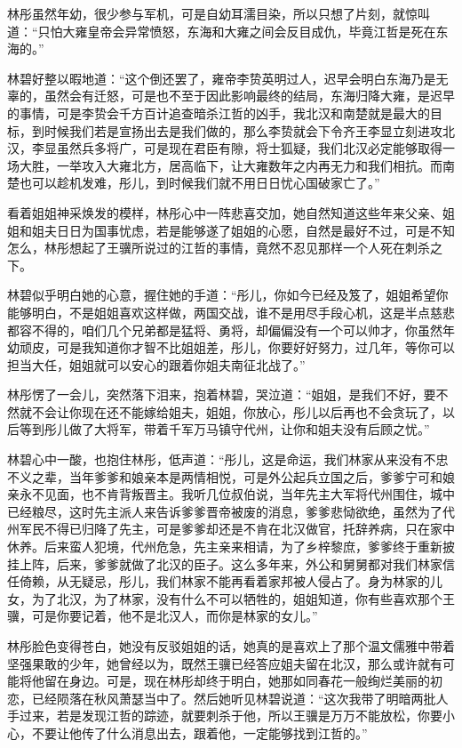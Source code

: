林彤虽然年幼，很少参与军机，可是自幼耳濡目染，所以只想了片刻，就惊叫道：“只怕大雍皇帝会异常愤怒，东海和大雍之间会反目成仇，毕竟江哲是死在东海的。”

林碧好整以暇地道：“这个倒还罢了，雍帝李贽英明过人，迟早会明白东海乃是无辜的，虽然会有迁怒，可是也不至于因此影响最终的结局，东海归降大雍，是迟早的事情，可是李贽会千方百计追查暗杀江哲的凶手，我北汉和南楚就是最大的目标，到时候我们若是宣扬出去是我们做的，那么李贽就会下令齐王李显立刻进攻北汉，李显虽然兵多将广，可是现在君臣有隙，将士狐疑，我们北汉必定能够取得一场大胜，一举攻入大雍北方，居高临下，让大雍数年之内再无力和我们相抗。而南楚也可以趁机发难，彤儿，到时候我们就不用日日忧心国破家亡了。”

看着姐姐神采焕发的模样，林彤心中一阵悲喜交加，她自然知道这些年来父亲、姐姐和姐夫日日为国事忧虑，若是能够遂了姐姐的心愿，自然是最好不过，可是不知怎么，林彤想起了王骥所说过的江哲的事情，竟然不忍见那样一个人死在刺杀之下。

林碧似乎明白她的心意，握住她的手道：“彤儿，你如今已经及笈了，姐姐希望你能够明白，不是姐姐喜欢这样做，两国交战，谁不是用尽手段心机，这是半点慈悲都容不得的，咱们几个兄弟都是猛将、勇将，却偏偏没有一个可以帅才，你虽然年幼顽皮，可是我知道你才智不比姐姐差，彤儿，你要好好努力，过几年，等你可以担当大任，姐姐就可以安心的跟着你姐夫南征北战了。”

林彤愣了一会儿，突然落下泪来，抱着林碧，哭泣道：“姐姐，是我们不好，要不然就不会让你现在还不能嫁给姐夫，姐姐，你放心，彤儿以后再也不会贪玩了，以后等到彤儿做了大将军，带着千军万马镇守代州，让你和姐夫没有后顾之忧。”

林碧心中一酸，也抱住林彤，低声道：“彤儿，这是命运，我们林家从来没有不忠不义之辈，当年爹爹和娘亲本是两情相悦，可是外公起兵立国之后，爹爹宁可和娘亲永不见面，也不肯背叛晋主。我听几位叔伯说，当年先主大军将代州围住，城中已经粮尽，这时先主派人来告诉爹爹晋帝被废的消息，爹爹悲恸欲绝，虽然为了代州军民不得已归降了先主，可是爹爹却还是不肯在北汉做官，托辞养病，只在家中休养。后来蛮人犯境，代州危急，先主亲来相请，为了乡梓黎庶，爹爹终于重新披挂上阵，后来，爹爹就做了北汉的臣子。这么多年来，外公和舅舅都对我们林家信任倚赖，从无疑忌，彤儿，我们林家不能再看着家邦被人侵占了。身为林家的儿女，为了北汉，为了林家，没有什么不可以牺牲的，姐姐知道，你有些喜欢那个王骥，可是你要记着，他不是北汉人，而你是林家的女儿。”

林彤脸色变得苍白，她没有反驳姐姐的话，她真的是喜欢上了那个温文儒雅中带着坚强果敢的少年，她曾经以为，既然王骥已经答应姐夫留在北汉，那么或许就有可能将他留在身边。可是，现在林彤却终于明白，她那如同春花一般绚烂美丽的初恋，已经陨落在秋风萧瑟当中了。然后她听见林碧说道：“这次我带了明暗两批人手过来，若是发现江哲的踪迹，就要刺杀于他，所以王骥是万万不能放松，你要小心，不要让他传了什么消息出去，跟着他，一定能够找到江哲的。”


